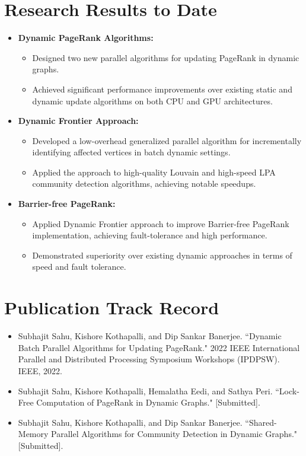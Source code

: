 \documentclass[a4paper,10pt]{article}
\begin{document}
\section*{Research Results to Date}
\begin{itemize}[noitemsep, leftmargin=*]
  \item \textbf{Dynamic PageRank Algorithms:}
    \begin{itemize}[noitemsep, leftmargin=*]
      \item Designed two new parallel algorithms for updating PageRank in dynamic graphs.
      \item Achieved significant performance improvements over existing static and dynamic update algorithms on both CPU and GPU architectures.
    \end{itemize}
  \item \textbf{Dynamic Frontier Approach:}
    \begin{itemize}[noitemsep, leftmargin=*]
      \item Developed a low-overhead generalized parallel algorithm for incrementally identifying affected vertices in batch dynamic settings.
      \item Applied the approach to high-quality Louvain and high-speed LPA community detection algorithms, achieving notable speedups.
    \end{itemize}
  \item \textbf{Barrier-free PageRank:}
    \begin{itemize}[noitemsep, leftmargin=*]
      \item Applied Dynamic Frontier approach to improve Barrier-free PageRank implementation, achieving fault-tolerance and high performance.
      \item Demonstrated superiority over existing dynamic approaches in terms of speed and fault tolerance.
    \end{itemize}
\end{itemize}

\section*{Publication Track Record}
\begin{itemize}[noitemsep, leftmargin=*]
  \item Subhajit Sahu, Kishore Kothapalli, and Dip Sankar Banerjee. ``Dynamic Batch Parallel Algorithms for Updating PageRank." 2022 IEEE International Parallel and Distributed Processing Symposium Workshops (IPDPSW). IEEE, 2022.
  \item Subhajit Sahu, Kishore Kothapalli, Hemalatha Eedi, and Sathya Peri. ``Lock-Free Computation of PageRank in Dynamic Graphs." [Submitted].
  \item Subhajit Sahu, Kishore Kothapalli, and Dip Sankar Banerjee. ``Shared-Memory Parallel Algorithms for Community Detection in Dynamic Graphs." [Submitted].
\end{itemize}
\end{document}
